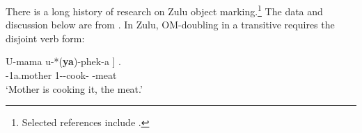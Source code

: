 \documentclass[output=paper]{langscibook}
\begin{document}



\noindent There is a long history of research on Zulu object marking.\footnote{Selected references include \citet{Adams:2010:Thesis,Buell:2005:Thesis,Buell:2006:ZuluConjointDisjoint,ChengDowning:2009:ZuluTopic,Halpert:2016:Book,VanDerSpuy:1993:NguniOm,Zeller:2012:ZuluOM,Zeller:2014:ZuluOm3Types,Zeller:2015:ZuluDrD}.} The data and discussion below are from \citet{Zeller:2015:ZuluDrD}. In Zulu, OM-doubling in a transitive requires the disjoint verb form:  

\ea 

\gll U-mama u-*(\textbf{ya})-phek-a {]} .\\
\Aug-1a.mother 1\Sm-\Om-cook-\Fv{} {} -meat \\ %
\glt `Mother is cooking it, the meat.’ \citep[20]{Zeller:2015:ZuluDrD}


\z 





\end{document}
